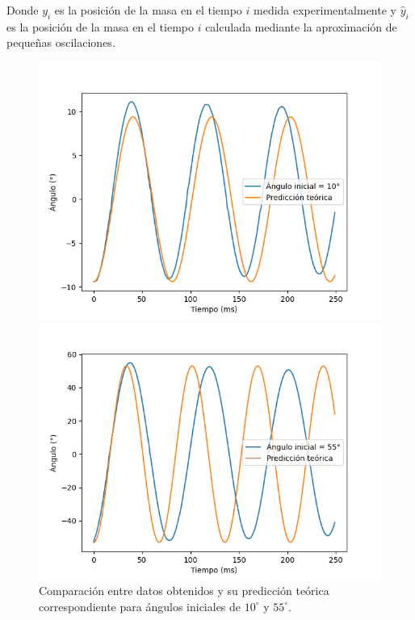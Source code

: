 \documentclass[12pt,a4]{article}
\begin{document}
Donde $y_i$ es la posición de la masa en el tiempo $i$ medida experimentalmente y $\hat{y}_i$ es la posición de la masa en el tiempo $i$ calculada mediante la aproximación de pequeñas oscilaciones.
\begin{figure}[H]
    \centering
    \begin{minipage}{0.5\textwidth}
        \centering
        \includegraphics[width=\textwidth]{peq_osc_10.png}
    \end{minipage}%
    \begin{minipage}{0.5\textwidth}
        \centering
        \includegraphics[width=\textwidth]{peq_osc_55.png}
    \end{minipage}
    \caption{Comparación entre datos obtenidos y su predicción teórica correspondiente para ángulos iniciales de $10^\circ$ y $55^\circ$.}
    \label{fig:comparacion_angulos}
\end{figure}
\end{document}
